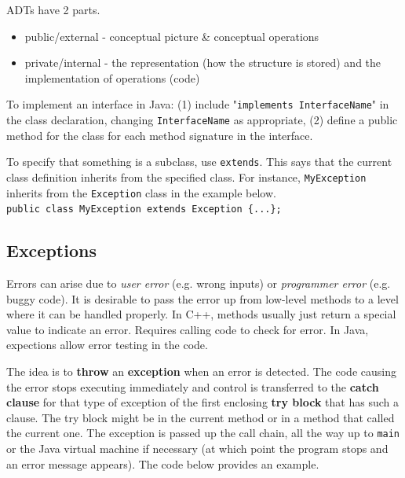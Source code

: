 ADTs have 2 parts.
\begin{itemize}
	\item public/external - conceptual picture \& conceptual operations
	\item private/internal - the representation (how the structure is stored) and the implementation of operations (code)
\end{itemize}

To implement an interface in Java: (1) include "\texttt{implements InterfaceName}" in the class declaration, changing \texttt{InterfaceName} as appropriate, (2) define a public method for the class for each method signature in the interface. 

To specify that something is a subclass, use \texttt{extends}. This says that the current class definition inherits from the specified class. For instance, \texttt{MyException} inherits from the \texttt{Exception} class in the example below. \\

\texttt{public class MyException extends Exception \{...\};} \\

\subsection{Exceptions}

Errors can arise due to \textit{user error} (e.g. wrong inputs) or \textit{programmer error} (e.g. buggy code). It is desirable to pass the error up from low-level methods to a level where it can be handled properly. In C++, methods usually just return a special value to indicate an error. Requires calling code to check for error. In Java, expections allow error testing in the code. 

The idea is to \textbf{throw} an \textbf{exception} when an error is detected. The code causing the error stops executing immediately and control is transferred to the \textbf{catch clause} for that type of exception of the first enclosing \textbf{try block} that has such a clause. The try block might be in the current method or in a method that called the current one. The exception is passed up the call chain, all the way up to \texttt{main} or the Java virtual machine if necessary (at which point the program stops and an error message appears). The code below provides an example. \\ 

